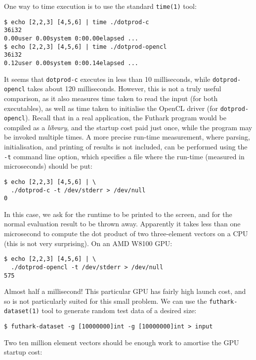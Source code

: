 \documentclass[oneside,11pt]{book}
\begin{document}
One way to time execution is to use the standard \texttt{time(1)}
tool:

\begin{verbatim}
$ echo [2,2,3] [4,5,6] | time ./dotprod-c
36i32
0.00user 0.00system 0:00.00elapsed ...
$ echo [2,2,3] [4,5,6] | time ./dotprod-opencl
36i32
0.12user 0.00system 0:00.14elapsed ...
\end{verbatim}

It seems that \texttt{dotprod-c} executes in less than 10
milliseconds, while \texttt{dotprod-opencl} takes about 120
milliseconds.  However, this is not a truly useful comparison, as it
also measures time taken to read the input (for both executables), as
well as time taken to initialise the OpenCL driver (for
\texttt{dotprod-opencl}).  Recall that in a real application, the
Futhark program would be compiled as a \textit{library}, and the
startup cost paid just once, while the program may be invoked multiple
times.  A more precise run-time measurement, where parsing,
initialisation, and printing of results is not included, can be
performed using the \texttt{-t} command line option, which specifies a
file where the run-time (measured in microseconds) should be put:

\begin{verbatim}
$ echo [2,2,3] [4,5,6] | \
  ./dotprod-c -t /dev/stderr > /dev/null
0
\end{verbatim}

In this case, we ask for the runtime to be printed to the screen, and
for the normal evaluation result to be thrown away.  Apparently it
takes less than one microsecond to compute the dot product of two
three-element vectors on a CPU (this is not very surprising).  On an
AMD W8100 GPU:

\begin{verbatim}
$ echo [2,2,3] [4,5,6] | \
  ./dotprod-opencl -t /dev/stderr > /dev/null
575
\end{verbatim}

Almost half a millisecond!  This particular GPU has fairly high launch
cost, and so is not particularly suited for this small problem.  We
can use the \texttt{futhark-dataset(1)} tool to generate random test
data of a desired size:

\begin{verbatim}
$ futhark-dataset -g [10000000]int -g [10000000]int > input
\end{verbatim}

Two ten million element vectors should be enough work to amortise the
GPU startup cost:
\end{document}
